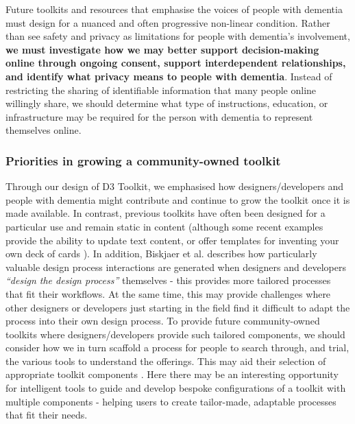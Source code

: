 Future toolkits and resources that emphasise the voices of people with dementia must design for a nuanced and often progressive non-linear condition. Rather than see safety and privacy as limitations for people with dementia's involvement, \textbf{we must investigate how we may better support decision-making online through ongoing consent, support interdependent relationships, and identify what privacy means to people with dementia}. Instead of restricting the sharing of identifiable information that many people online willingly share, we should determine what type of instructions, education, or infrastructure may be required for the person with dementia to represent themselves online. 

\subsubsection{Priorities in growing a community-owned toolkit}
Through our design of D3 Toolkit, we emphasised how designers/developers and people with dementia might contribute and continue to grow the toolkit once it is made available. In contrast, previous toolkits have often been designed for a particular use and remain static in content (although some recent examples provide the ability to update text content, or offer templates for inventing your own deck of cards \citep{garcia2019designing,mora2017tiles}). In addition, Biskjaer et al. describes how particularly valuable design process interactions are generated when designers and developers \textit{“design the design process”} \citep{mose2017understanding} themselves - this provides more tailored processes that fit their workflows. At the same time, this may provide challenges where other designers or developers just starting in the field find it difficult to adapt the process into their own design process. To provide future community-owned toolkits where designers/developers provide such tailored components, we should consider how we in turn scaffold a process for people to search through, and trial, the various tools to understand the offerings. This may aid their selection of appropriate toolkit components \citep{lee2021landscape}. Here there may be an interesting opportunity for intelligent tools to guide and develop bespoke configurations of a toolkit with multiple components - helping users to create tailor-made, adaptable processes that fit their needs. 

